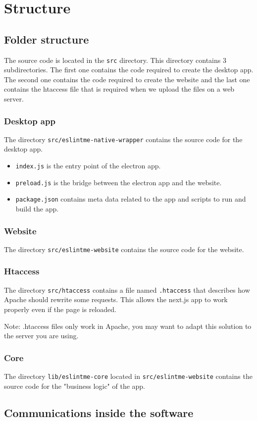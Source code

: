 \section{Structure}
\subsection{Folder structure}
The source code is located in the \verb|src| directory. 
This directory contains 3 subdirectories. 
The first one contains the code required to create the desktop app. 
The second one contains the code required to create the website 
and the last one contains the htaccess file that is required when we upload the files on a web server.

\subsubsection{Desktop app}
The directory \verb|src/eslintme-native-wrapper| contains 
the source code for the desktop app. 

\begin{itemize}
    \item \verb|index.js| is the entry point of the electron app.
    \item \verb|preload.js| is the bridge between the electron app and the website.
    \item \verb|package.json| contains meta data related to the app and scripts to run and build the app.
\end{itemize}

\subsubsection{Website}
The directory \verb|src/eslintme-website| contains 
the source code for the website.
\subsubsection{Htaccess}
The directory \verb|src/htaccess| contains a file named \verb|.htaccess| that 
describes how Apache should rewrite some requests. 
This allows the next.js app to work properly even if the page is reloaded. 

\noindent Note: .htaccess files only work in Apache, 
you may want to adapt this solution to the server you are using.

\subsubsection{Core}
The directory \verb|lib/eslintme-core| located in \verb|src/eslintme-website| contains 
the source code for the "business logic" of the app.

\subsection{Communications inside the software}